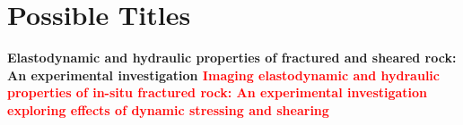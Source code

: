 
\section{Possible Titles}
\begin{flushleft}
	\begin{Large}
		\textbf{Elastodynamic and hydraulic properties of fractured and sheared rock: An experimental investigation 
			\linebreak \linebreak \linebreak
			\textcolor{red}{Imaging elastodynamic and hydraulic properties of in-situ fractured rock: An experimental investigation exploring effects of dynamic stressing and shearing}}
	\end{Large}
\end{flushleft}